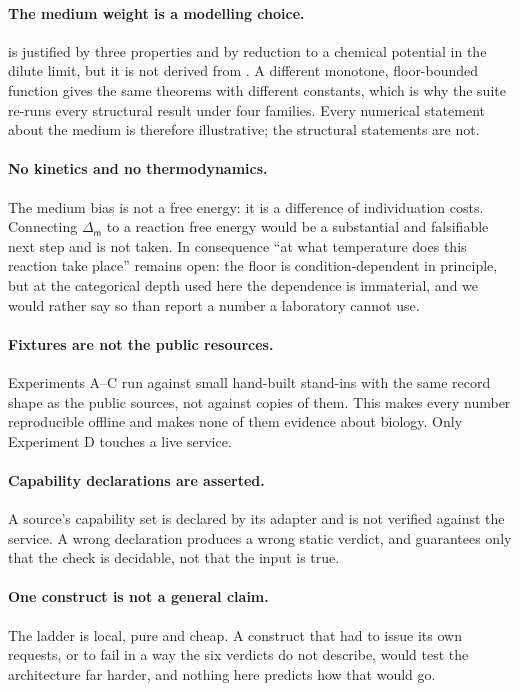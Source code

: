 \documentclass[11pt,twocolumn,a4paper]{article}
\theoremstyle{thmstyle}
\theoremstyle{definition}
\theoremstyle{remark}
\newcommand{\med}{\mathsf{m}}
\begin{document}
\paragraph{The medium weight is a modelling choice.}
 is justified by three properties and by reduction to a
chemical potential in the dilute limit, but it is not derived from
. A different monotone, floor-bounded function gives the same
theorems with different constants, which is why the suite re-runs every
structural result under four families. Every numerical statement about the
medium is therefore illustrative; the structural statements are not.

\paragraph{No kinetics and no thermodynamics.} The medium bias is not a free
energy: it is a difference of individuation costs. Connecting
$\Delta_\med$ to a reaction free energy \citep{beard2007,noor2013} would be a
substantial and falsifiable next step and is not taken. In consequence ``at what temperature does this
reaction take place'' remains open: the floor is condition-dependent in
principle, but at the categorical depth used here the dependence is
immaterial, and we would rather say so than report a number a laboratory
cannot use.

\paragraph{Fixtures are not the public resources.} Experiments A--C run
against small hand-built stand-ins with the same record shape as the public
sources, not against copies of them. This makes every number reproducible
offline and makes none of them evidence about biology. Only Experiment D
touches a live service.

\paragraph{Capability declarations are asserted.} A source's capability set is
declared by its adapter and is not verified against the service. A wrong
declaration produces a wrong static verdict, and  guarantees
only that the check is decidable, not that the input is true.

\paragraph{One construct is not a general claim.} The ladder is local, pure
and cheap. A construct that had to issue its own requests, or to fail in a way
the six verdicts do not describe, would test the architecture far harder, and
nothing here predicts how that would go.
\end{document}
